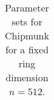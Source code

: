 \begin{table}
\begin{tabular}{ccr|cc|cccrr|crr|c}
  
    \end{tabular}
    \caption{Parameter sets for Chipmunk for a fixed ring dimension $n=512$.}\label{tab:param}
  \end{table}
\egroup

